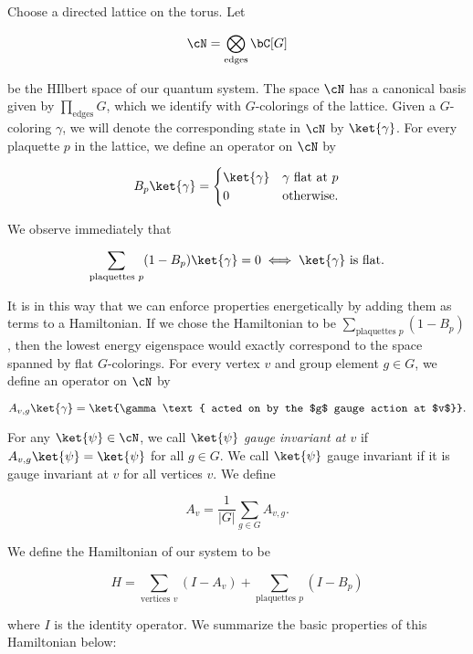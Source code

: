 Choose a directed lattice on the torus. Let

$$\cN=\bigotimes_{\text{edges}}\bC[G]$$

be the HIlbert space of our quantum system. The space $\cN$ has a canonical basis given by $\prod_{\text{edges}}G$, which we  identify with $G$-colorings of the lattice. Given a $G$-coloring $\gamma$, we will denote the corresponding state in $\cN$ by $\ket{\gamma}$. For every plaquette $p$ in the lattice, we define an operator on $\cN$ by

$$B_p\ket{\gamma}=
\begin{cases}
\ket{\gamma} & \gamma \text{ flat at }p\\
0 & \text{otherwise}.
\end{cases}$$

We observe immediately that

$$\sum_{\text{plaquettes }p}(1-B_p)\ket{\gamma}=0 \iff \ket{\gamma} \text{ is flat.}$$

It is in this way that we can enforce properties energetically by adding them as terms to a Hamiltonian. If we chose the Hamiltonian to be $\sum_{\text{plaquettes }p}(1-B_p)$, then the lowest energy eigenspace would exactly correspond to the space spanned by flat $G$-colorings. For every vertex $v$ and group element $g\in G$, we define an operator on $\cN$ by

$$A_{v,g}\ket{\gamma}=\ket{\gamma \text{ acted on by the $g$ gauge action at $v$}}.$$

For any $\ket{\psi}\in \cN$, we call $\ket{\psi}$ \textit{gauge invariant at $v$} if $A_{v,g}\ket{\psi}=\ket{\psi}$ for all $g\in G$. We call $\ket{\psi}$ gauge invariant if it is gauge invariant at $v$ for all vertices $v$. We define

$$A_v=\frac{1}{|G|}\sum_{g\in G}A_{v,g}.$$

We define the Hamiltonian of our system to be

$$H=\sum_{\text{vertices $v$}}(I-A_v)+\sum_{\text{plaquettes $p$}}(I-B_p)$$

where $I$ is the identity operator. We summarize the basic properties of this Hamiltonian below:

